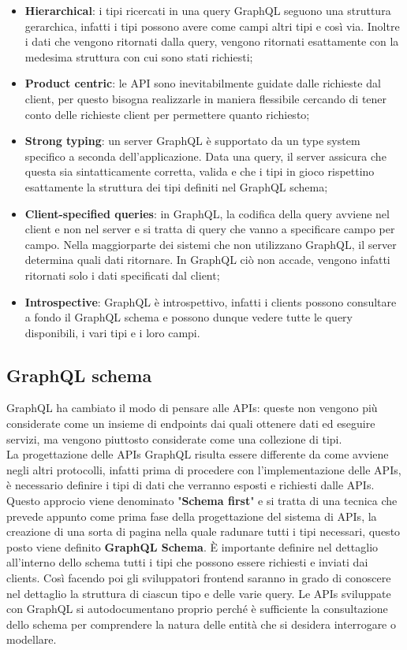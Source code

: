 \begin{itemize}
  \item \textbf{Hierarchical}: i tipi ricercati in una query GraphQL seguono una struttura gerarchica, infatti i tipi possono avere come campi altri tipi e così via. Inoltre i dati che vengono ritornati dalla query, vengono ritornati esattamente con la medesima struttura con cui sono stati richiesti;
  \item \textbf{Product centric}: le API sono inevitabilmente guidate dalle richieste dal client, per questo bisogna realizzarle in maniera flessibile cercando di tener conto delle richieste client per permettere quanto richiesto;
  \item \textbf{Strong typing}: un server GraphQL è supportato da un type system specifico a seconda dell'applicazione. Data una query, il server assicura che questa sia sintatticamente corretta, valida e che i tipi in gioco rispettino esattamente la struttura dei tipi definiti nel GraphQL schema;
  \item \textbf{Client-specified queries}: in GraphQL, la codifica della query avviene nel client e non nel server e si tratta di query che vanno a specificare campo per campo. Nella maggiorparte dei sistemi che non utilizzano GraphQL, il server determina quali dati ritornare. In GraphQL ciò non accade, vengono infatti ritornati solo i dati specificati dal client;
  \item \textbf{Introspective}: GraphQL è introspettivo, infatti i clients possono consultare a fondo il GraphQL schema e possono dunque vedere tutte le query disponibili, i vari tipi e i loro campi.
\end{itemize}
\subsection*{GraphQL schema}
GraphQL ha cambiato il modo di pensare alle APIs: queste non vengono più considerate come un insieme di endpoints dai quali ottenere dati ed eseguire servizi, ma vengono piuttosto considerate come una collezione di tipi.\\
La progettazione delle APIs GraphQL risulta essere differente da come avviene negli altri protocolli, infatti prima di procedere con l'implementazione delle APIs, è necessario definire i tipi di dati che verranno esposti e richiesti dalle APIs. Questo approcio viene denominato "\textbf{Schema first}" e si tratta di una tecnica che prevede appunto come prima fase della progettazione del sistema di APIs, la creazione di una sorta di pagina nella quale radunare tutti i tipi necessari, questo posto viene definito \textbf{GraphQL Schema}. È importante definire nel dettaglio all'interno dello schema tutti i tipi che possono essere richiesti e inviati dai clients. Così facendo poi gli sviluppatori frontend saranno in grado di conoscere nel dettaglio la struttura di ciascun tipo e delle varie query. Le APIs sviluppate con GraphQL si autodocumentano proprio perché è sufficiente la consultazione dello schema per comprendere la natura delle entità che si desidera interrogare o modellare.\\
